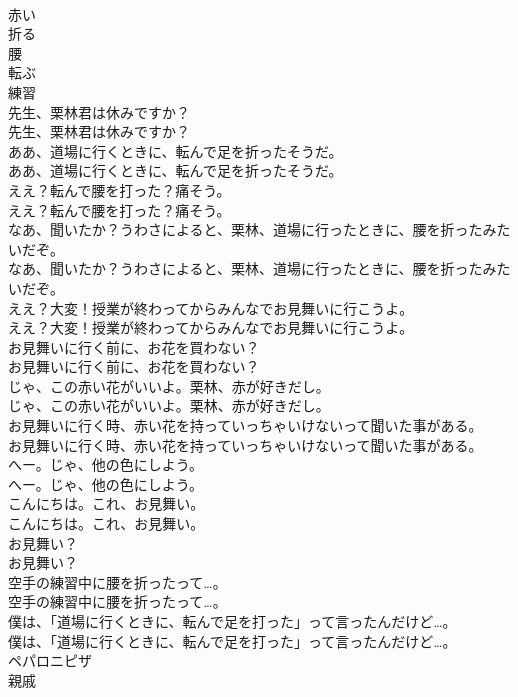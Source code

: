 \documentclass[8pt]{extreport}
\begin{document}
\begin{CJK}{UTF8}{min}
\\	赤い
\\	折る
\\	腰
\\	転ぶ
\\	練習
\\	先生、栗林君は休みですか？	
\\	先生、栗林君は休みですか？ 
\\	ああ、道場に行くときに、転んで足を折ったそうだ。	
\\	ああ、道場に行くときに、転んで足を折ったそうだ。 
\\	ええ？転んで腰を打った？痛そう。	
\\	ええ？転んで腰を打った？痛そう。 
\\	なあ、聞いたか？うわさによると、栗林、道場に行ったときに、腰を折ったみたいだぞ。	
\\	なあ、聞いたか？うわさによると、栗林、道場に行ったときに、腰を折ったみたいだぞ。 
\\	ええ？大変！授業が終わってからみんなでお見舞いに行こうよ。	
\\	ええ？大変！授業が終わってからみんなでお見舞いに行こうよ。 
\\	お見舞いに行く前に、お花を買わない？	
\\	お見舞いに行く前に、お花を買わない？ 
\\	じゃ、この赤い花がいいよ。栗林、赤が好きだし。	
\\	じゃ、この赤い花がいいよ。栗林、赤が好きだし。 
\\	お見舞いに行く時、赤い花を持っていっちゃいけないって聞いた事がある。	
\\	お見舞いに行く時、赤い花を持っていっちゃいけないって聞いた事がある。 
\\	へー。じゃ、他の色にしよう。	
\\	へー。じゃ、他の色にしよう。 
\\	こんにちは。これ、お見舞い。	
\\	こんにちは。これ、お見舞い。 
\\	お見舞い？	
\\	お見舞い？ 
\\	空手の練習中に腰を折ったって…。	
\\	空手の練習中に腰を折ったって…。 
\\	僕は、「道場に行くときに、転んで足を打った」って言ったんだけど…。	
\\	僕は、「道場に行くときに、転んで足を打った」って言ったんだけど…。 
\\	ペパロニピザ
\\	親戚

\end{CJK}
\end{document}
